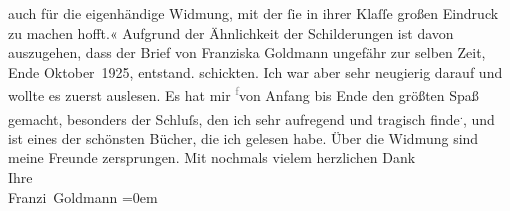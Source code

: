 \begin{ledgroupsized}[t]{13cm}
{{{                  auch für die eigenhändige Widmung, mit der ſie in ihrer Klaſſe großen Eindruck zu
                  machen hofft.« Aufgrund der Ähnlichkeit der Schilderungen ist davon auszugehen,
                  dass der Brief von Franziska Goldmann
                  ungefähr zur selben Zeit, Ende Oktober 1925,
                  entstand.}}}\label{K_L03539-1h} schickten. Ich war aber sehr neugierig darauf und wollte es
               zuerst auslesen. Es hat mir \substVorne{}\textsuperscript{\textcolor{gray}{f}}\substDazwischen{}v\substHinten{}on Anfang bis Ende den größten Spaß gemacht, besonders der Schluſs, den ich
               sehr aufregend und tragisch finde\substVorne{}\textsuperscript{.}\substDazwischen{},\substHinten{} und ist eines der schönsten Bücher, die ich gelesen habe. Über die Widmung
               sind meine \label{T_L03539-1v}\label{T_L03539-1h} Freunde zersprungen.\pend
           \pstart
           {\pb}Mit nochmals vielem herzlichen Dank {\\[\baselineskip]}Ihre {\\[\baselineskip]}\spacefill\mbox{Franzi Goldmann}\pend
           \leftskip=0em{}
         
         \endnumbering{}\end{ledgroupsized}\begin{anhang}\end{anhang}\newcommand{\dateiname}{L03539}\newcommand{\titel}{Franziska Goldmann an Arthur Schnitzler, [Ende Oktober 1925?]}\newcommand{\editorInnen}{Martin Anton Müller und Laura Untner}
      
